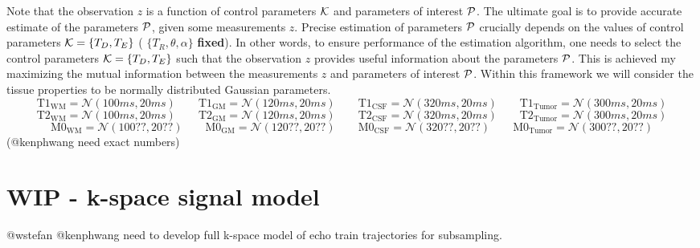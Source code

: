 \documentclass{article}         %
\theoremstyle{definition}
\theoremstyle{remark}
\begin{document}
Note that the observation $z$ is a function of control parameters $\mathcal{K}$ and
parameters of interest $\mathcal{P}$.  The ultimate goal is to provide accurate estimate
of the parameters $\mathcal{P}$, given some measurements $z$. 
Precise estimation of parameters $\mathcal{P}$ crucially depends on the values of
control parameters $\mathcal{K}=\{T_D,T_E\}$ ( $\{T_R,\theta,\alpha\}$ \textbf{fixed}).  
In other words, to ensure
performance of the estimation algorithm, one needs to select the control
parameters $\mathcal{K}=\{T_D,T_E\}$ such that the observation $z$ provides
useful information about the parameters $\mathcal{P}$. This is achieved my maximizing
the mutual information between the measurements $z$ and parameters of interest
$\mathcal{P}$.  Within this framework we will consider the tissue properties to be
normally distributed Gaussian parameters.
\[
  \text{T1}_\text{WM}    =  \mathcal{N}(100ms, 20ms)  \qquad
  \text{T1}_\text{GM}    =  \mathcal{N}(120ms, 20ms)  \qquad
  \text{T1}_\text{CSF}   =  \mathcal{N}(320ms, 20ms)  \qquad
  \text{T1}_\text{Tumor} =  \mathcal{N}(300ms, 20ms)
\]
\[
  \text{T2}_\text{WM}    =  \mathcal{N}(100ms, 20ms)  \qquad
  \text{T2}_\text{GM}    =  \mathcal{N}(120ms, 20ms)  \qquad
  \text{T2}_\text{CSF}   =  \mathcal{N}(320ms, 20ms)  \qquad
  \text{T2}_\text{Tumor} =  \mathcal{N}(300ms, 20ms)
\]
\[
  \text{M0}_\text{WM}    =  \mathcal{N}(100??, 20??)  \qquad
  \text{M0}_\text{GM}    =  \mathcal{N}(120??, 20??)  \qquad
  \text{M0}_\text{CSF}   =  \mathcal{N}(320??, 20??)  \qquad
  \text{M0}_\text{Tumor} =  \mathcal{N}(300??, 20??)
\]
{\color{red}(@kenphwang need exact numbers)}

\section{WIP - k-space signal model}


{\color{red} @wstefan @kenphwang need to develop full k-space model of echo train trajectories for subsampling.}
\end{document}
